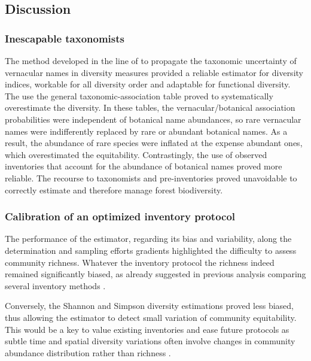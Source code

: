 \documentclass[
  11pt,
  french,
  A4paper,
  extrafontsizes,onecolumn,openright
  ]{memoir}
\begin{document}
\subsection{Discussion}\label{discussion}

\subsubsection{Inescapable taxonomists}\label{inescapable-taxonomists}

The method developed in the line of \textcite{Guitet2014b} to propagate
the taxonomic uncertainty of vernacular names in diversity measures
provided a reliable estimator for diversity indices, workable for all
diversity order and adaptable for functional diversity. The use the
general taxonomic-association table proved to systematically
overestimate the diversity. In these tables, the vernacular/botanical
association probabilities were independent of botanical name abundances,
so rare vernacular names were indifferently replaced by rare or abundant
botanical names. As a result, the abundance of rare species were
inflated at the expense abundant ones, which overestimated the
equitability. Contrastingly, the use of observed inventories that
account for the abundance of botanical names proved more reliable. The
recourse to taxonomists and pre-inventories proved unavoidable to
correctly estimate and therefore manage forest biodiversity.

\subsubsection{Calibration of an optimized inventory
protocol}\label{calibration-of-an-optimized-inventory-protocol}

The performance of the estimator, regarding its bias and variability,
along the determination and sampling efforts gradients highlighted the
difficulty to assess community richness. Whatever the inventory protocol
the richness indeed remained significantly biased, as already suggested
in previous analysis comparing several inventory methods
\autocite{Higgins2004}.

Conversely, the Shannon and Simpson diversity estimations proved less
biased, thus allowing the estimator to detect small variation of
community equitability. This would be a key to value existing
inventories and ease future protocols as subtle time and spatial
diversity variations often involve changes in community abundance
distribution rather than richness
\autocites{Baraloto2012a}{Berry2008a}{Cannon1998}{Plumptre1996}.
\end{document}
